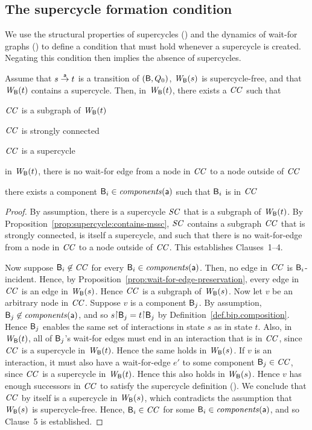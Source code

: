 


\subsection{The supercycle formation condition}

We use the structural properties of supercycles () and the 
dynamics of wait-for graphs () to define a condition that 
must hold whenever a supercycle is created. Negating this condition then implies the absence of
supercycles. 


\begin{proposition} \label{prop:supercycle-formation}
Assume that $s \goesto[\act] t$ is a transition of $(\B, Q_0)$, $\wfg{\B}{s}$ is supercycle-free, and that $\wfg{\B}{t}$
contains a supercycle.  Then, in $\wfg{\B}{t}$, there exists a $\CC$ such that
\bn
\item $\CC$ is a subgraph of $\wfg{\B}{t}$
\item $\CC$ is strongly connected
\item $\CC$ is a supercycle
\item  in $\wfg{\B}{t}$, there is no wait-for edge from a node in $\CC$ to a node outside of $\CC$
\item there exists a component $\B_i \in \cmps{\act}$ such that $\B_i$ is in $\CC$
\en
\end{proposition}
%
\begin{proof}
By assumption, there is a supercycle $\SC$ that is a subgraph of $\wfg{\B}{t}$.
By Proposition~\ref{prop:supercycle:contains-mssc}, $\SC$ contains a
subgraph $\CC$ that is strongly connected, is itself a supercycle, and
such that there is no wait-for-edge from a node in $\CC$ to a node outside of $\CC$.
This establishes Clauses~1--4.

Now suppose $\B_i \not\in \CC$ for every $\B_i \in \cmps{\act}$. Then, no edge in $\CC$ is
$\B_i$-incident.  Hence, by Proposition~\ref{prop:wait-for-edge-preservation}, every edge in $\CC$
is an edge in $\wfg{\B}{s}$. Hence $\CC$ is a subgraph of $\wfg{\B}{s}$.
%
Now let $v$ be an arbitrary node in $\CC$.
%
Suppose $v$ is a component $\B_j$.  By assumption, $\B_j \not\in \cmps{\act}$, and so
$s \pj \B_j = t \pj \B_j$ by Definition~\ref{def.bip.composition}. Hence $\B_j$ enables the same set
of interactions in state $s$ as in state $t$. Also, in $\wfg{\B}{t}$, all of $\B_j$'s wait-for edges
must end in an interaction that is in $\CC$, since $\CC$ is a supercycle in $\wfg{\B}{t}$. Hence the
same holds in $\wfg{\B}{s}$.
%
If $v$ is an interaction, it must also have a wait-for-edge $e'$ to some component $\B_j \in \CC$,
since $\CC$ is a supercycle in $\wfg{\B}{t}$. Hence this also holds in $\wfg{\B}{s}$.
%
Hence $v$ has enough successors in $\CC$ to satisfy the supercycle definition ().
%
We conclude that $\CC$ by itself is a supercycle in $\wfg{\B}{s}$, which contradicts the assumption
that $\wfg{\B}{s}$ is supercycle-free. Hence, $\B_i \in \CC$ for some $\B_i \in \cmps{\act}$, and so
Clause~5 is established.  
\end {proof}



